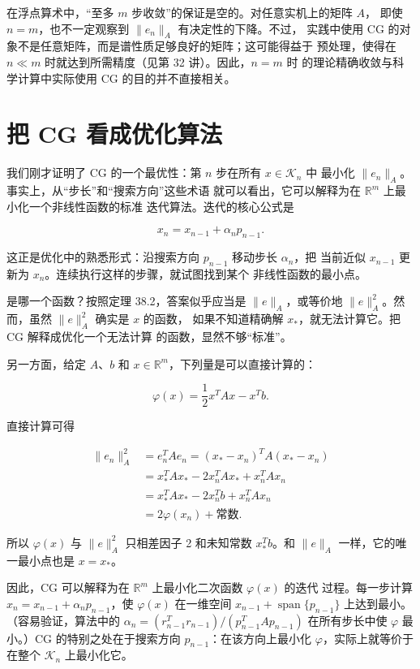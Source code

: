 \documentclass[UTF8,fontset=none,12pt]{ctexart}
\begin{document}
在浮点算术中，“至多 $m$ 步收敛”的保证是空的。对任意实机上的矩阵 $A$，
即使 $n=m$，也不一定观察到 $\lVert e_n\rVert_A$ 有决定性的下降。不过，
实践中使用 CG 的对象不是任意矩阵，而是谱性质足够良好的矩阵；这可能得益于
预处理，使得在 $n\ll m$ 时就达到所需精度（见第 32 讲）。因此，$n=m$ 时
的理论精确收敛与科学计算中实际使用 CG 的目的并不直接相关。

\section*{把 CG 看成优化算法}

我们刚才证明了 CG 的一个最优性：第 $n$ 步在所有 $x\in\mathcal K_n$ 中
最小化 $\lVert e_n\rVert_A$。事实上，从“步长”和“搜索方向”这些术语
就可以看出，它可以解释为在 $\mathbb R^m$ 上最小化一个非线性函数的标准
迭代算法。迭代的核心公式是

\[
x_n=x_{n-1}+\alpha_np_{n-1}.
\]

这正是优化中的熟悉形式：沿搜索方向 $p_{n-1}$ 移动步长 $\alpha_n$，把
当前近似 $x_{n-1}$ 更新为 $x_n$。连续执行这样的步骤，就试图找到某个
非线性函数的最小点。

是哪一个函数？按照定理 38.2，答案似乎应当是 $\lVert e\rVert_A$，或等价地
$\lVert e\rVert_A^2$。然而，虽然 $\lVert e\rVert_A^2$ 确实是 $x$ 的函数，
如果不知道精确解 $x_\ast$，就无法计算它。把 CG 解释成优化一个无法计算
的函数，显然不够“标准”。

另一方面，给定 $A$、$b$ 和 $x\in\mathbb R^m$，下列量是可以直接计算的：

\begin{equation}
\varphi(x)=\frac12x^TAx-x^Tb.
\tag{38.7}
\end{equation}

直接计算可得

\[
\begin{aligned}
\lVert e_n\rVert_A^2
&=e_n^TAe_n=(x_\ast-x_n)^TA(x_\ast-x_n)\\
&=x_\ast^TAx_\ast-2x_n^TAx_\ast+x_n^TAx_n\\
&=x_\ast^TAx_\ast-2x_n^Tb+x_n^TAx_n\\
&=2\varphi(x_n)+\text{常数}.
\end{aligned}
\]

所以 $\varphi(x)$ 与 $\lVert e\rVert_A^2$ 只相差因子 2 和未知常数
$x_\ast^Tb$。和 $\lVert e\rVert_A$ 一样，它的唯一最小点也是 $x=x_\ast$。

因此，CG 可以解释为在 $\mathbb R^m$ 上最小化二次函数 $\varphi(x)$ 的迭代
过程。每一步计算
$x_n=x_{n-1}+\alpha_np_{n-1}$，使 $\varphi(x)$ 在一维空间
$x_{n-1}+\operatorname{span}\{p_{n-1}\}$ 上达到最小。（容易验证，算法中的
$\alpha_n=(r_{n-1}^Tr_{n-1})/(p_{n-1}^TAp_{n-1})$ 在所有步长中使
$\varphi$ 最小。）CG 的特别之处在于搜索方向 $p_{n-1}$：在该方向上最小化
$\varphi$，实际上就等价于在整个 $\mathcal K_n$ 上最小化它。
\end{document}
